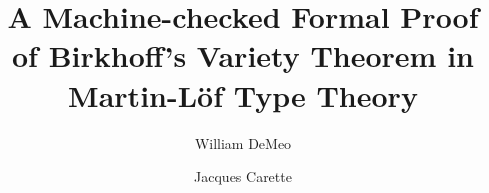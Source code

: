 \documentclass[a4paper,UKenglish,cleveref,autoref,thm-restate]{lipics-v2021}
\title{A Machine-checked Formal Proof of Birkhoff's Variety Theorem in Martin-L\"of Type Theory}
\author{William DeMeo}
       {\url{https://williamdemeo.org}}
       {williamdemeo@gmail.com}{https://orcid.org/0000-0003-1832-5690}{}
\author{Jacques Carette}{McMaster University}{carette@mcmaster.ca}{https://orcid.org/0000-0001-8993-9804}{}
\begin{document}
\maketitle



% 

% 



\providecommand{\hypertarget}[2]{#2}

\renewcommand\texttt[1]{\textsf{#1}}

% 
% 
% 
% 
% 

\let\paragraph\subsubsection
\let\subsubsection\subsection
\let\subsection\section
\end{document}
